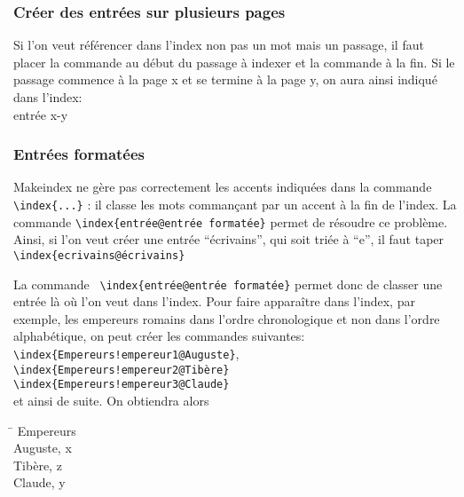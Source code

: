
  

\subsubsection{Créer des entrées sur plusieurs pages}

Si l'on veut référencer dans l'index non pas un mot mais un passage, il faut placer la commande  au début du passage à indexer et la commande   à la fin. Si le passage commence à la page x et se termine à la page y, on aura ainsi indiqué dans l'index: \\
entrée x-y


\subsubsection{Entrées formatées}

Makeindex ne gère pas correctement les accents indiquées dans la commande \verb+\index{...}+ : il classe les mots commançant par un accent à la fin de l'index. La commande \verb+\index{entrée@entrée formatée}+ permet de résoudre ce problème. Ainsi, si l'on veut créer une entrée \enquote{écrivains}, qui soit triée à \enquote{e}, il faut taper \verb+\index{ecrivains@écrivains}+

La commande \verb+ \index{entrée@entrée formatée}+ permet donc de classer une entrée là où l'on veut dans l'index. Pour faire apparaître dans l'index, par exemple, les empereurs romains dans l'ordre chronologique et non dans l'ordre alphabétique, on peut créer les commandes suivantes:\\
\verb+\index{Empereurs!empereur1@Auguste}+,\\ \verb+\index{Empereurs!empereur2@Tibère}+\\
\verb+\index{Empereurs!empereur3@Claude}+\\
et ainsi de suite. On obtiendra alors
\begin{tabbing}
\hspace{0,5cm} \= \kill
Empereurs\\
\> Auguste, x\\
\> Tibère, z\\
\> Claude, y \\

\end{tabbing}

